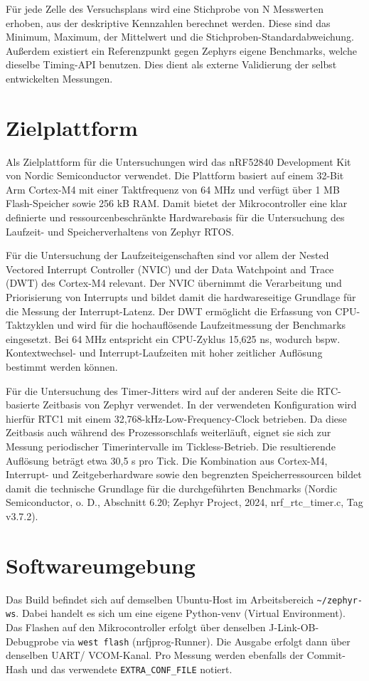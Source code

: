 F{\"u}r jede Zelle des Versuchsplans wird eine Stichprobe von N Messwerten erhoben, aus der deskriptive Kennzahlen berechnet werden. Diese sind das Minimum, Maximum, der Mittelwert und die Stichproben-Standardabweichung. Au{\ss}erdem existiert ein Referenzpunkt gegen Zephyrs eigene Benchmarks, welche dieselbe Timing-API benutzen. Dies dient als externe Validierung der selbst entwickelten Messungen.

\section{Zielplattform}
Als Zielplattform f{\"u}r die Untersuchungen wird das nRF52840 Development Kit von Nordic Semiconductor verwendet. Die Plattform basiert auf einem 32-Bit Arm Cortex-M4 mit einer Taktfrequenz von 64 MHz und verf{\"u}gt {\"u}ber 1 MB Flash-Speicher sowie 256 kB RAM. Damit bietet der Mikrocontroller eine klar definierte und ressourcenbeschr{\"a}nkte Hardwarebasis f{\"u}r die Untersuchung des Laufzeit- und Speicherverhaltens von Zephyr RTOS.

F{\"u}r die Untersuchung der Laufzeiteigenschaften sind vor allem der Nested Vectored Interrupt Controller (NVIC) und der Data Watchpoint and Trace (DWT) des Cortex-M4 relevant. Der NVIC {\"u}bernimmt die Verarbeitung und Priorisierung von Interrupts und bildet damit die hardwareseitige Grundlage f{\"u}r die Messung der Interrupt-Latenz. Der DWT erm{\"o}glicht die Erfassung von CPU-Taktzyklen und wird f{\"u}r die hochaufl{\"o}sende Laufzeitmessung der Benchmarks eingesetzt. Bei 64 MHz entspricht ein CPU-Zyklus 15,625 ns, wodurch bspw. Kontextwechsel- und Interrupt-Laufzeiten mit hoher zeitlicher Aufl{\"o}sung bestimmt werden k{\"o}nnen.

F{\"u}r die Untersuchung des Timer-Jitters wird auf der anderen Seite die RTC-basierte Zeitbasis von Zephyr verwendet. In der verwendeten Konfiguration wird hierf{\"u}r RTC1 mit einem 32,768-kHz-Low-Frequency-Clock betrieben. Da diese Zeitbasis auch w{\"a}hrend des Prozessorschlafs weiterl{\"a}uft, eignet sie sich zur Messung periodischer Timerintervalle im Tickless-Betrieb. Die resultierende Aufl{\"o}sung betr{\"a}gt etwa 30,5 \textmu{}s pro Tick. Die Kombination aus Cortex-M4, Interrupt- und Zeitgeberhardware sowie den begrenzten Speicherressourcen bildet damit die technische Grundlage f{\"u}r die durchgef{\"u}hrten Benchmarks (Nordic Semiconductor, o. D., Abschnitt 6.20; Zephyr Project, 2024, nrf\_rtc\_timer.c, Tag v3.7.2).

\section{Softwareumgebung}
Das Build befindet sich auf demselben Ubuntu-Host im Arbeitsbereich \lstinline[style=codeinline]|~/zephyr-ws|. Dabei handelt es sich um eine eigene Python-venv (Virtual Environment). Das Flashen auf den Mikrocontroller erfolgt {\"u}ber denselben J-Link-OB-Debugprobe via \lstinline[style=codeinline]|west flash| (nrfjprog-Runner). Die Ausgabe erfolgt dann {\"u}ber denselben UART/ VCOM-Kanal. Pro Messung werden ebenfalls der Commit-Hash und das verwendete \lstinline[style=codeinline]|EXTRA_CONF_FILE| notiert.

